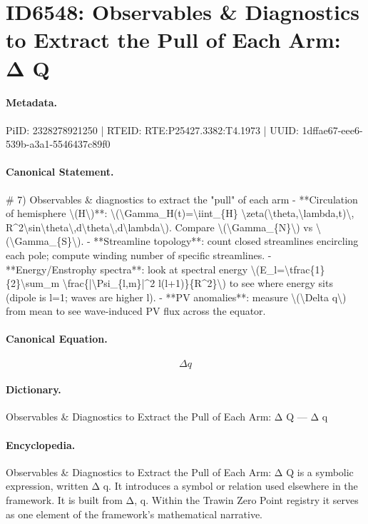 \section*{ID6548: Observables \& Diagnostics to Extract the Pull of Each Arm: Δ Q}
\paragraph{Metadata.}
PiID: 2328278921250 | RTEID: RTE:P25427.3382:T4.1973 | UUID: 1dffae67-eee6-539b-a3a1-5546437c89f0

\paragraph{Canonical Statement.}
\# 7) Observables \& diagnostics to extract the "pull" of each arm - **Circulation of hemisphere \textbackslash{}(H\textbackslash{})**: \textbackslash{}(\textbackslash{}Gamma\_H(t)=\textbackslash{}iint\_\{H\} \textbackslash{}zeta(\textbackslash{}theta,\textbackslash{}lambda,t)\textbackslash{}, R\textasciicircum{}2\textbackslash{}sin\textbackslash{}theta\textbackslash{},d\textbackslash{}theta\textbackslash{},d\textbackslash{}lambda\textbackslash{}). Compare \textbackslash{}(\textbackslash{}Gamma\_\{N\}\textbackslash{}) vs \textbackslash{}(\textbackslash{}Gamma\_\{S\}\textbackslash{}). - **Streamline topology**: count closed streamlines encircling each pole; compute winding number of specific streamlines. - **Energy/Enstrophy spectra**: look at spectral energy \textbackslash{}(E\_l=\textbackslash{}tfrac\{1\}\{2\}\textbackslash{}sum\_m \textbackslash{}frac\{|\textbackslash{}Psi\_\{l,m\}|\textasciicircum{}2 l(l+1)\}\{R\textasciicircum{}2\}\textbackslash{}) to see where energy sits (dipole is l=1; waves are higher l). - **PV anomalies**: measure \textbackslash{}(\textbackslash{}Delta q\textbackslash{}) from mean to see wave-induced PV flux across the equator.

\paragraph{Canonical Equation.}
\[
\Delta q
\]

\paragraph{Dictionary.}
Observables \& Diagnostics to Extract the Pull of Each Arm: Δ Q — Δ q

\paragraph{Encyclopedia.}
Observables \& Diagnostics to Extract the Pull of Each Arm: Δ Q is a symbolic expression, written Δ q. It introduces a symbol or relation used elsewhere in the framework. It is built from Δ, q. Within the Trawin Zero Point registry it serves as one element of the framework's mathematical narrative.
